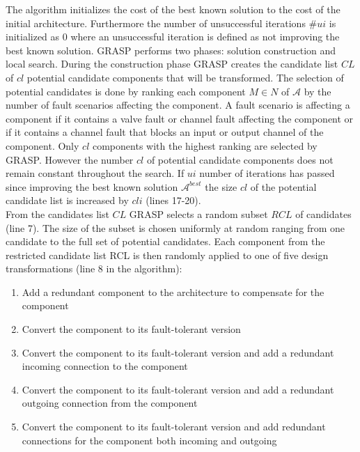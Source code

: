 The algorithm initializes the cost of the best known solution to the cost of the initial architecture. Furthermore the number of unsuccessful iterations $\#ui$ is initialized as 0 where an unsuccessful iteration is defined as not improving the best known solution. GRASP performs two phases: solution construction and local search. During the construction phase GRASP creates the candidate list $CL$ of $cl$ potential candidate components that will be transformed. The selection of potential candidates is done by ranking each component $M \in N$ of $\mathcal{A}$ by the number of fault scenarios affecting the component. A fault scenario is affecting a component if it contains a valve fault or channel fault affecting the component or if it contains a channel fault that blocks an input or output channel of the component. Only $cl$ components with the highest ranking are selected by GRASP. However the number $cl$ of potential candidate components does not remain constant throughout the search. If $ui$ number of iterations has passed since improving the best known solution $\mathcal{A}^{best}$ the size $cl$ of the potential candidate list is increased by $cli$ (lines 17-20).\\
From the candidates list $CL$ GRASP selects a random subset $RCL$ of candidates (line 7). The size of the subset is chosen uniformly at random ranging from one candidate to the full set of potential candidates. Each component from the restricted candidate list RCL is then randomly applied to one of five design transformations (line 8 in the algorithm):
\begin{enumerate}
\item Add a redundant component to the architecture to compensate for the component

\item Convert the component to its fault-tolerant version

\item Convert the component to its fault-tolerant version and add a redundant incoming connection to the component

\item Convert the component to its fault-tolerant version and add a redundant outgoing connection from the component

\item Convert the component to its fault-tolerant version and add redundant connections for the component both incoming and outgoing

\end{enumerate}

